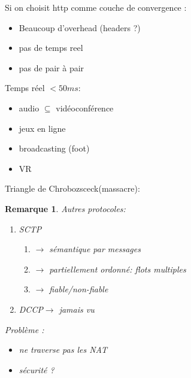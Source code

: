 \documentclass[12pt]{article}
\theoremstyle{plain}
\newtheorem{rem}{Remarque}
\theoremstyle{definition}
\theoremstyle{remark}
\begin{document}
Si on choisit http comme couche de convergence :
\begin{itemize}
    \item Beaucoup d'overhead (headers ?)
    \item pas de temps reel
    \item pas de pair à pair
\end{itemize}

\noindent Temps réel $<50ms$:
\begin{itemize}
    \item audio $\subseteq$ vidéoconférence
    \item jeux en ligne
    \item broadcasting (foot)
    \item VR\\
\end{itemize}

\noindent Triangle de Chrobozsceck(massacre):\begin{center}

\indent \indent {}
\end{center}

\begin{rem}
    Autres protocoles: \begin{enumerate}
        \item SCTP \begin{enumerate}
            \item $\rightarrow$ sémantique par messages
            \item $\rightarrow$ partiellement ordonné: flots multiples
            \item $\rightarrow$ fiable/non-fiable
        \end{enumerate}
        \item DCCP$\rightarrow$ jamais vu
    \end{enumerate}
Problème :\begin{itemize}
    \item ne traverse pas les NAT
    \item sécurité ?
\end{itemize}
\end{rem}
\end{document}

